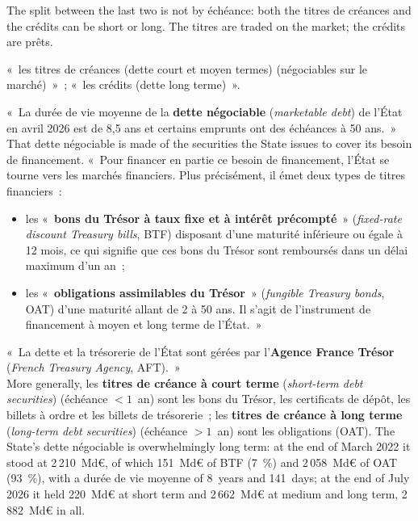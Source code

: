 The split between the last two is not by échéance: both the titres de créances
and the crédits can be short or long. The titres are traded on the market; the
crédits are prêts.

\begin{remark}
  «~les titres de créances (dette court et moyen termes) (négociables sur le
  marché)~»~; «~les crédits (dette long terme)~».
\end{remark}

«~La durée de vie moyenne de la \textbf{dette négociable} (\textit{marketable
debt}) de l'État en avril 2026 est de 8,5 ans et certains emprunts ont des
échéances à 50 ans.~» That dette négociable is made of the securities the State
issues to cover its besoin de financement. «~Pour financer en partie ce besoin de
financement, l'État se tourne vers les marchés financiers. Plus précisément, il
émet deux types de titres financiers~:
\begin{itemize}
  \item les «~\textbf{bons du Trésor à taux fixe et à intérêt précompté}~»
    (\textit{fixed-rate discount Treasury bills}, BTF) disposant d'une maturité
    inférieure ou égale à 12 mois, ce qui signifie que ces bons du Trésor sont
    remboursés dans un délai maximum d'un an~;
  \item les «~\textbf{obligations assimilables du Trésor}~»
    (\textit{fungible Treasury bonds}, OAT) d'une maturité allant de 2 à 50 ans. Il
    s'agit de l'instrument de financement à moyen et long terme de l'État.~»
\end{itemize}
«~La dette et la trésorerie de l'État sont gérées par l'\textbf{Agence France
Trésor} (\textit{French Treasury Agency}, AFT).~»\\

More generally, les \textbf{titres de créance à court terme}
(\textit{short-term debt securities}) (échéance $< 1$~an) sont les bons du
Trésor, les certificats de dépôt, les billets à ordre et les billets de
trésorerie~; les \textbf{titres de créance à long terme} (\textit{long-term debt
securities}) (échéance $> 1$~an) sont les obligations (OAT). The State's
dette négociable is overwhelmingly long term: at the end of March 2022 it stood
at 2\,210~Md€, of which 151~Md€ of BTF (7~\%) and 2\,058~Md€ of OAT (93~\%), with
a durée de vie moyenne of 8~years and 141~days; at the end of July 2026 it held
220~Md€ at short term and 2\,662~Md€ at medium and long term, 2\,882~Md€ in
all.

